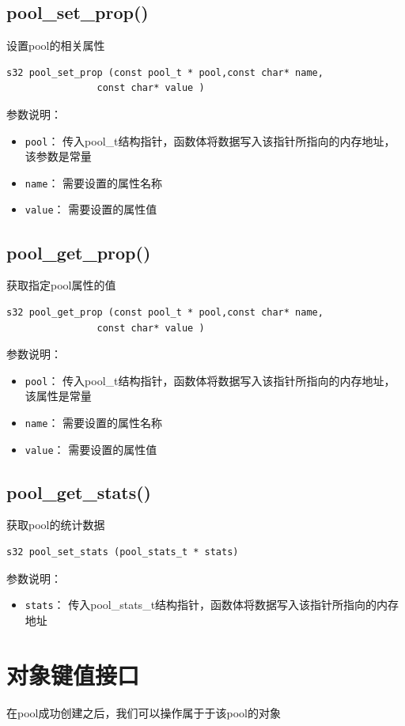 	\subsection{pool\_set\_prop()}
		设置pool的相关属性
		\begin{Verbatim}[frame = none]
    s32 pool_set_prop (const pool_t * pool,const char* name, 
			    const char* value )
		\end{Verbatim}

		参数说明：
		\begin{itemize}
		\item \verb|pool|：
			传入pool\_t结构指针，函数体将数据写入该指针所指向的内存地址，该参数是常量
		\item \verb|name|：
			需要设置的属性名称
		\item \verb|value|：
			需要设置的属性值
		\end{itemize}
	\subsection{pool\_get\_prop()}
		获取指定pool属性的值
		\begin{Verbatim}[frame = none]
    s32 pool_get_prop (const pool_t * pool,const char* name, 
			    const char* value )
		\end{Verbatim}

		参数说明：
		\begin{itemize}
		\item \verb|pool|：
			传入pool\_t结构指针，函数体将数据写入该指针所指向的内存地址，该属性是常量
		\item \verb|name|：
			需要设置的属性名称
		\item \verb|value|：
			需要设置的属性值
		\end{itemize}

	\subsection{pool\_get\_stats()}
		获取pool的统计数据
		\begin{Verbatim}[frame = none]
    s32 pool_set_stats (pool_stats_t * stats)
		\end{Verbatim}		

		参数说明：
		\begin{itemize}
		\item \verb|stats|：
			传入pool\_stats\_t结构指针，函数体将数据写入该指针所指向的内存地址
		\end{itemize}
	
	\section{对象键值接口}
		在pool成功创建之后，我们可以操作属于于该pool的对象

